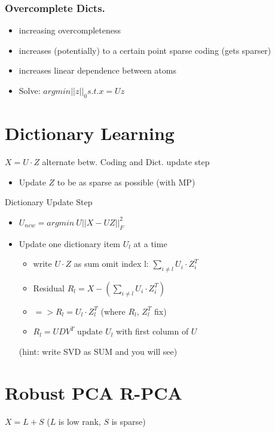 \documentclass[11pt,twocolumn]{article}
\begin{document}
\subsubsection{Overcomplete Dicts.}
\begin{itemize}
\item increasing overcompleteness
\item increases (potentially) to a certain point sparse coding (gets sparser)
\item increases linear dependence between atoms
\item Solve: $arg min ||z||_0 s.t. x = Uz$

\end{itemize}



\section{Dictionary Learning}
$X = U \cdot Z$ alternate betw.
Coding and Dict. update step
\begin{itemize}
\item Update $Z$ to be as sparse as possible (with MP)
\end{itemize}

Dictionary Update Step
\begin{itemize}
\item  $U_{new} =  arg min~ U  ||X-UZ||^2_F$
\item Update one dictionary item $U_l$ at a time
	\begin{itemize}
	

  \item write $U \cdot Z$ as sum omit index l: 
  $\sum_{i \neq l}{U_i \cdot Z^T_i}$
  \item Residual $R_l =  X - \left(\sum_{i \neq l}{U_i \cdot Z^T_i}\right)$
  \item $=> R_l = U_l \cdot Z^T_l$ (where $R_l$, $Z^T_l$ fix)
  \item $R_l = UDV^T$ update $U_l$ with first column of $U$
	\end{itemize}  
   (hint: write SVD as SUM and you will see)

\end{itemize}


\section{Robust PCA R-PCA}
$X = L + S$  ($L$ is low rank, $S$ is sparse)
\end{document}
